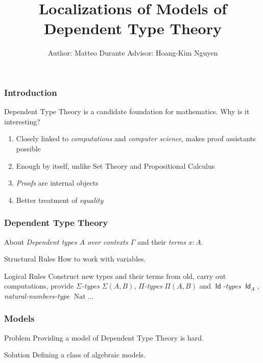 \documentclass{beamer}
\title{Localizations of Models of Dependent Type Theory}
\author{Author: Matteo Durante \quad\quad\quad Advisor: Hoang-Kim Nguyen}
\institute{Regensburg University}
\DeclareMathOperator{\Id}{\mathsf{Id}}
\DeclareMathOperator{\nat}{Nat}
\begin{document}
\theoremstyle{plain}

\newtheorem{thm}{Theorem}[section]
\newtheorem{prop}{Proposition}[section]
\newtheorem{defn}{Definition}[section]
\newtheorem{conj}{Conjecture}[section]
\newtheorem{lem}{Lemma}[section]

\frame{\titlepage}

\begin{frame}
  \frametitle{Introduction}

  Dependent Type Theory is a candidate foundation for mathematics. Why is it
  interesting?

  \begin{enumerate}
    \item Closely linked to \emph{computations} and \emph{computer science},
      makes proof assistants possible
    \item Enough by itself, unlike Set Theory and Propositional Calculus
    \item \emph{Proofs} are internal objects
    \item Better treatment of \emph{equality}
  \end{enumerate}
\end{frame}

\begin{frame}
  \frametitle{Dependent Type Theory}
  
  \begin{block}{About}
    \emph{Dependent types $A$ over contexts
    $\Gamma$} and their \emph{terms $x:A$}.
  \end{block}

  \begin{block}{Structural Rules}
    How to work with variables.
  \end{block}

  \begin{block}{Logical Rules}
    Construct new types and their terms from old, carry out
    computations, provide \emph{$\Sigma$-types} $\Sigma(A,B)$, \emph{$\Pi$-types}
    $\Pi(A,B)$ and \emph{$\Id$-types} $\Id_A$, \emph{natural-numbers-type}
    $\nat$...
  \end{block}
\end{frame}

\begin{frame}
  \frametitle{Models}

  \begin{block}{Problem}
    Providing a model of Dependent Type Theory is hard.
  \end{block}

  \begin{block}{Solution}
    Defining a class of algebraic models.
  \end{block}
\end{frame}
\end{document}
